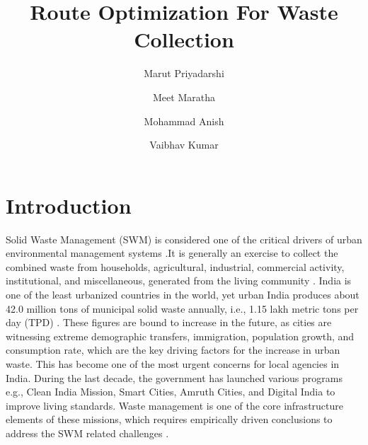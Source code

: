 \documentclass[12pt]{article}
\begin{document}

\title{Route Optimization For Waste Collection\\}
\date{}
\author[1]{Marut Priyadarshi}
\author[2]{Meet Maratha}
\author[3]{Mohammad Anish}
\author[4]{Vaibhav Kumar}

\maketitle

\section{Introduction}

Solid Waste Management (SWM) is considered one of the critical drivers of urban environmental management systems \cite{hoornweg2012waste}.It is generally an exercise to collect the combined waste from households, agricultural, industrial, commercial activity, institutional, and miscellaneous, generated from the living community \cite{GUPTA2015206}. India is one of the least urbanized countries in the world, yet urban India produces about 42.0 million tons of municipal solid waste annually, i.e., 1.15 lakh metric tons per day (TPD) \cite{SHARMA2021293,GUPTA2015206}. These figures are bound to increase in the future, as cities are witnessing extreme demographic transfers, immigration, population growth, and consumption rate, which are the key driving factors for the increase in urban waste. This has become one of the most urgent concerns for local agencies in India. During the last decade, the government has launched various programs e.g., Clean India Mission, Smart Cities, Amruth Cities, and Digital India to improve living standards. Waste management is one of the core infrastructure elements of these missions, which requires empirically driven conclusions to address the SWM related challenges \cite{CHEELA2021419}. 
\end{document}
